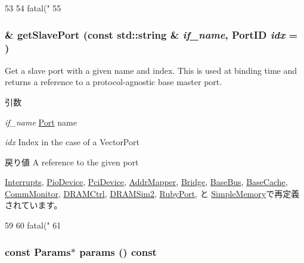 \begin{DoxyCode}
53 {
54     fatal("%
55 }
\end{DoxyCode}
\hypertarget{classMemObject_ac918a145092d7514ebc6dbd952dceafb}{
\subsubsection[{getSlavePort}]{ \& getSlavePort (const std::string \& {\em if\_\-name}, \/  {\bf PortID} {\em idx} = {})}}
\label{classMemObject_ac918a145092d7514ebc6dbd952dceafb}
Get a slave port with a given name and index. This is used at binding time and returns a reference to a protocol-\/agnostic base master port.


\begin{DoxyParams}{引数}
\item[{\em if\_\-name}]\hyperlink{classPort}{Port} name \item[{\em idx}]Index in the case of a VectorPort\end{DoxyParams}
\begin{DoxyReturn}{戻り値}
A reference to the given port 
\end{DoxyReturn}


\hyperlink{classX86ISA_1_1Interrupts_a5b5b45105eb4b64567ecea56e5bc30f2}{Interrupts}, \hyperlink{classPioDevice_ac918a145092d7514ebc6dbd952dceafb}{PioDevice}, \hyperlink{classPciDevice_a4edba7d5e567b66fcd93297802a97077}{PciDevice}, \hyperlink{classAddrMapper_ac918a145092d7514ebc6dbd952dceafb}{AddrMapper}, \hyperlink{classBridge_ac918a145092d7514ebc6dbd952dceafb}{Bridge}, \hyperlink{classBaseBus_ac918a145092d7514ebc6dbd952dceafb}{BaseBus}, \hyperlink{classBaseCache_ac918a145092d7514ebc6dbd952dceafb}{BaseCache}, \hyperlink{classCommMonitor_ac918a145092d7514ebc6dbd952dceafb}{CommMonitor}, \hyperlink{classDRAMCtrl_a4edba7d5e567b66fcd93297802a97077}{DRAMCtrl}, \hyperlink{classDRAMSim2_ac918a145092d7514ebc6dbd952dceafb}{DRAMSim2}, \hyperlink{classRubyPort_ac918a145092d7514ebc6dbd952dceafb}{RubyPort}, と \hyperlink{classSimpleMemory_ac918a145092d7514ebc6dbd952dceafb}{SimpleMemory}で再定義されています。


\begin{DoxyCode}
59 {
60     fatal("%
61 }
\end{DoxyCode}
\hypertarget{classMemObject_acd3c3feb78ae7a8f88fe0f110a718dff}{
\subsubsection[{params}]{\setlength{\rightskip}{0pt plus 5cm}const {\bf Params}$\ast$ params () const}}
\label{classMemObject_acd3c3feb78ae7a8f88fe0f110a718dff}


